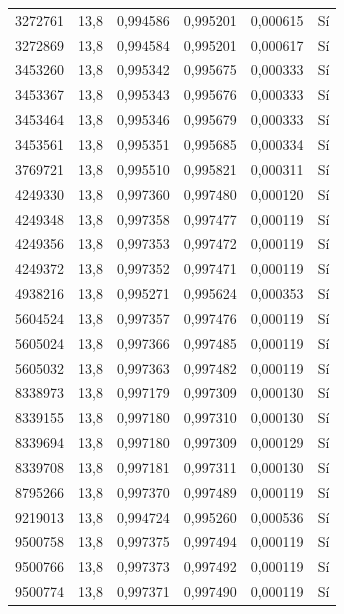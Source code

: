 \begin{longtable}{lccccc}
3272761 & 13,8 & 0,994586 & 0,995201 & 0,000615 & Sí \\
3272869 & 13,8 & 0,994584 & 0,995201 & 0,000617 & Sí \\
3453260 & 13,8 & 0,995342 & 0,995675 & 0,000333 & Sí \\
3453367 & 13,8 & 0,995343 & 0,995676 & 0,000333 & Sí \\
3453464 & 13,8 & 0,995346 & 0,995679 & 0,000333 & Sí \\
3453561 & 13,8 & 0,995351 & 0,995685 & 0,000334 & Sí \\
3769721 & 13,8 & 0,995510 & 0,995821 & 0,000311 & Sí \\
4249330 & 13,8 & 0,997360 & 0,997480 & 0,000120 & Sí \\
4249348 & 13,8 & 0,997358 & 0,997477 & 0,000119 & Sí \\
4249356 & 13,8 & 0,997353 & 0,997472 & 0,000119 & Sí \\
4249372 & 13,8 & 0,997352 & 0,997471 & 0,000119 & Sí \\
4938216 & 13,8 & 0,995271 & 0,995624 & 0,000353 & Sí \\
5604524 & 13,8 & 0,997357 & 0,997476 & 0,000119 & Sí \\
5605024 & 13,8 & 0,997366 & 0,997485 & 0,000119 & Sí \\
5605032 & 13,8 & 0,997363 & 0,997482 & 0,000119 & Sí \\
8338973 & 13,8 & 0,997179 & 0,997309 & 0,000130 & Sí \\
8339155 & 13,8 & 0,997180 & 0,997310 & 0,000130 & Sí \\
8339694 & 13,8 & 0,997180 & 0,997309 & 0,000129 & Sí \\
8339708 & 13,8 & 0,997181 & 0,997311 & 0,000130 & Sí \\
8795266 & 13,8 & 0,997370 & 0,997489 & 0,000119 & Sí \\
9219013 & 13,8 & 0,994724 & 0,995260 & 0,000536 & Sí \\
9500758 & 13,8 & 0,997375 & 0,997494 & 0,000119 & Sí \\
9500766 & 13,8 & 0,997373 & 0,997492 & 0,000119 & Sí \\
9500774 & 13,8 & 0,997371 & 0,997490 & 0,000119 & Sí \\
\end{longtable}
\endgroup

